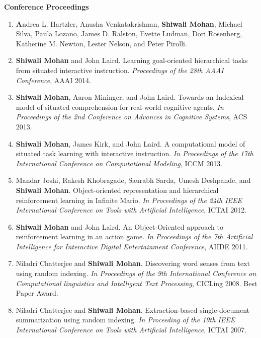 \documentclass[margin,line,11pt]{res}
\begin{document}
\begin{resume}
\textbf{Conference Proceedings}
\begin{enumerate}[label=\lbrack C\arabic*\rbrack,leftmargin=*]
  \item \textbf Andrea L. Hartzler, Anusha Venkatakrishnan,
    \textbf{Shiwali Mohan}, Michael Silva, Paula Lozano, James
    D. Ralston, Evette Ludman, Dori Rosenberg, Katherine M. Newton,
    Lester Nelson, and Peter Pirolli. 
\item \textbf{Shiwali Mohan} and John Laird. Learning goal-oriented hierarchical tasks from situated interactive instruction. \emph{Proceedings of the 28th AAAI Conference}, AAAI 2014.
\item \textbf{Shiwali Mohan}, Aaron Mininger, and John Laird. Towards an Indexical model of situated comprehension for real-world cognitive agents. \emph{In Proceedings of the 2nd Conference on Advances in Cognitive Systems}, ACS 2013.
\item \textbf{Shiwali Mohan}, James Kirk, and John Laird. A computational model of situated task learning with interactive instruction. \emph{In Proceedings of the 17th International Conference on Computational Modeling}, ICCM 2013.
\item Mandar Joshi, Rakesh Khobragade, Saurabh Sarda, Umesh Deshpande, and \textbf{Shiwali Mohan}. Object-oriented
representation and hierarchical reinforcement learning in Infinite Mario. \emph{In Proceedings of the 24th IEEE
International Conference on Tools with Artificial Intelligence}, ICTAI 2012.
\item \textbf{Shiwali Mohan} and John Laird. An Object-Oriented approach to reinforcement learning in an action game.
\emph{In Proceedings of the 7th Artificial Intelligence for Interactive Digital Entertainment Conference}, AIIDE 2011.
\item Niladri Chatterjee and \textbf{Shiwali Mohan}. Discovering word senses from text using random indexing. \emph{In
Proceedings of the 9th International Conference on Computational linguistics and Intelligent Text Processing},
CICLing 2008. Best Paper Award.
\item Niladri Chatterjee and \textbf{Shiwali Mohan}. Extraction-based single-document summarization using random
indexing. \emph{In Proceeding of the 19th IEEE International Conference on Tools with Artificial Intelligence}, ICTAI
2007.
\end{enumerate}


\end{resume}
\end{document}
